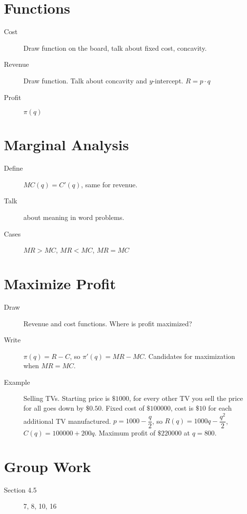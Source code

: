 \documentclass[11pt]{article}
\begin{document}
\drawtitle

\section*{Functions}
\begin{description}
\item[Cost] Draw function on the board, talk about fixed cost,
  concavity.
\item[Revenue] Draw function.  Talk about concavity and
  $y$-intercept. $R=p\cdot q$
\item[Profit] $\pi(q)$
\end{description}

\section*{Marginal Analysis}
\begin{description}
\item[Define] $MC(q)=C'(q)$, same for revenue.
\item[Talk] about meaning in word problems.  
\item[Cases] $MR>MC$, $MR<MC$, $MR=MC$
\end{description}

\section*{Maximize Profit}
\begin{description}
\item[Draw] Revenue and cost functions.  Where is profit maximized?
\item[Write] $\pi(q)=R-C$, so $\pi'(q)=MR-MC$.  Candidates for
  maximization when $MR=MC$.
\item[Example] Selling TVs. Starting price is $\$1000$, for every
  other TV you sell the price for all goes down by $\$0.50$.  Fixed
  cost of $\$100000$, cost is $\$10$ for each additional TV
  manufactured. $p=1000-\dfrac{q}{2}$, so $R(q)=1000q-\dfrac{q^2}{2}$,
  $C(q)=100000+200q$.  Maximum profit of $\$220000$ at $q=800$.
\end{description}




\section*{Group Work}
\begin{description}
\item[Section 4.5] 7, 8, 10, 16 
\end{description}
\end{document}
